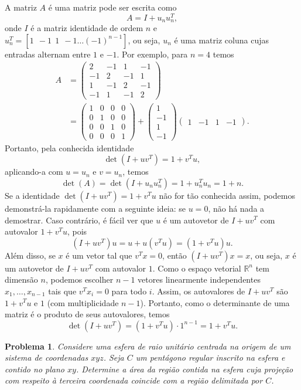\documentclass{hipatia}
\newtheorem{problem*}{Problema}
\begin{document}
A matriz $A$ é uma matriz pode ser 
escrita como $$A=I+u_n u_n^T,$$ onde
$I$ é a matriz identidade de ordem $n$ e \ \ \ \ \ \ \ \ \ \ \ \ \ \ \ $u_n^T=[1 \ \  -1 \ \ 1 \ \  -1 \ldots (-1)^{n-1}]$,
ou seja, $u_n$ é uma matriz coluna 
cujas entradas alternam entre $1$ e $-1$.
Por exemplo, para $n=4$ temos
\begin{align*}
    A & =  \begin{pmatrix}
2 & -1 & 1 & -1 \\
-1 & 2 & -1 & 1 \\
1 & -1 & 2 & -1 \\
-1 & 1 & -1 & 2
\end{pmatrix} \\ & =  \begin{pmatrix}
1 & 0 & 0 & 0 \\
0 & 1 & 0 & 0 \\ 
0 & 0 & 1 & 0 \\
0 & 0 & 0 & 1
\end{pmatrix} + \begin{pmatrix}
1 \\ -1 \\ 1 \\ -1
\end{pmatrix} \begin{pmatrix}1 & -1 & 1 & -1
\end{pmatrix}.
\end{align*}
Portanto, pela conhecida identidade 
$$\det(I+uv^T) = 1 + v^Tu,$$
aplicando-a com $u=u_n$ e $v=u_n$, temos
$$\det(A) = \det(I+u_n u_n^T) = 1 + u_n^T u_n = 1 + n.$$
Se a identidade $\det(I+uv^T) = 1 + v^Tu$ não for tão conhecida
assim, podemos demonstrá-la rapidamente com a seguinte ideia: 
se $u=0$, não há nada a demostrar. Caso contrário, é fácil ver
que $u$ é um autovetor de $I+uv^T$ com autovalor $1+v^Tu$, pois
$$(I+uv^T)u = u + u(v^Tu) = (1+v^Tu)u.$$
Além disso, se $x$ é um vetor tal que $v^Tx=0$, então $(I+uv^T)x = x$, ou seja, $x$ é um autovetor de $I+uv^T$ com autovalor $1$. Como o espaço vetorial $\mathbb{R}^n$ tem dimensão $n$, podemos escolher $n-1$ vetores linearmente independentes $x_1, \ldots, x_{n-1}$ tais que $v^Tx_i=0$ para todo $i$. Assim, os autovalores de $I+uv^T$ são $1+v^Tu$ e $1$ (com multiplicidade $n-1$). Portanto, como o determinante de uma matriz é o produto de seus autovalores, temos
$$\det(I+uv^T) = (1+v^Tu) \cdot 1^{n-1} = 1 + v^Tu.$$








\begin{problem*}
Considere uma esfera de raio unitário centrada na origem de um sistema de coordenadas $xyz$. Seja $C$ um pentágono regular inscrito na esfera e contido no plano $xy$. Determine a área da região contida na esfera cuja projeção com respeito à terceira coordenada coincide com a região delimitada por $C$.
\end{problem*}
\end{document}
